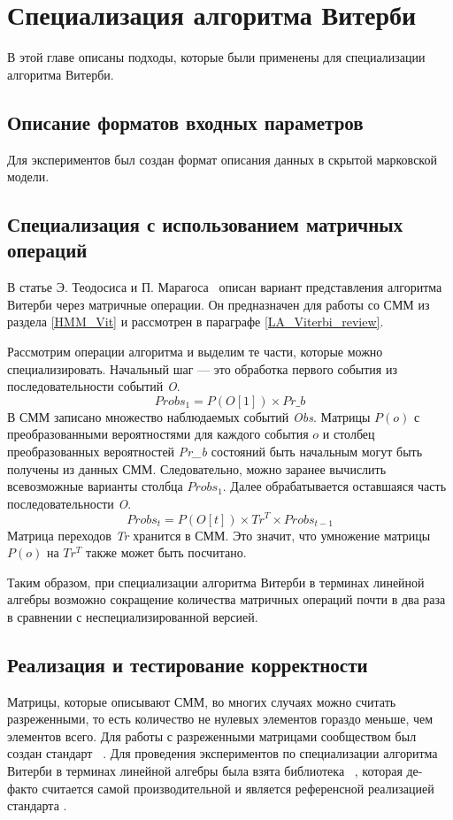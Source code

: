 \section{Специализация алгоритма Витерби}
В этой главе описаны подходы, которые были применены для 
специализации алгоритма Витерби.

\subsection{Описание форматов входных параметров}
Для экспериментов был создан формат описания данных в скрытой марковской модели.

\subsection{Специализация с использованием матричных операций}
В статье Э. Теодосиса и П. Марагоса~\cite{LA_Viterbi} описан 
вариант представления алгоритма Витерби через матричные 
операции.
Он предназначен для работы со СММ из раздела 
\ref{HMM_Vit} и рассмотрен в параграфе 
\ref{LA_Viterbi_review}.

Рассмотрим операции алгоритма и выделим те части, 
которые можно специализировать.
Начальный шаг --- это обработка первого события из 
последовательности событий \emph{O}.
\[Probs_{1} = P(O[1]) \times Pr\_b\]
В СММ записано множество наблюдаемых событий \emph{Obs}.
Матрицы $P(o)$ с преобразованными вероятностями для каждого 
события $o$ и столбец преобразованных вероятностей 
\emph{Pr\_b} состояний быть начальным могут быть 
получены из данных СММ.
Следовательно, можно заранее вычислить всевозможные варианты 
столбца $Probs_{1}$. 
Далее обрабатывается оставшаяся часть последовательности 
\emph{O}.
\[Probs_{t} = P(O[t]) \times Tr^{T} \times Probs_{t - 1}\]
Матрица переходов \emph{Tr} хранится в СММ.
Это значит, что умножение матрицы $P(o)$ на $Tr^{T}$ также 
может быть посчитано.

Таким образом, при специализации алгоритма Витерби в 
терминах линейной алгебры возможно сокращение количества 
матричных операций почти в два раза в сравнении с 
неспециализированной версией.

\subsection{Реализация и тестирование  корректности}
Матрицы, которые описывают СММ, во многих случаях можно 
считать разреженными, то есть количество не нулевых элементов 
гораздо меньше, чем элементов всего.
Для работы с разреженными матрицами сообществом был создан 
стандарт ~\cite{GraphBLAS}.
Для проведения экспериментов по специализации алгоритма 
Витерби в терминах линейной алгебры была взята библиотека 
~\cite{SuiteSparse}, 
которая де-факто считается самой производительной и является 
референсной реализацией стандарта .

